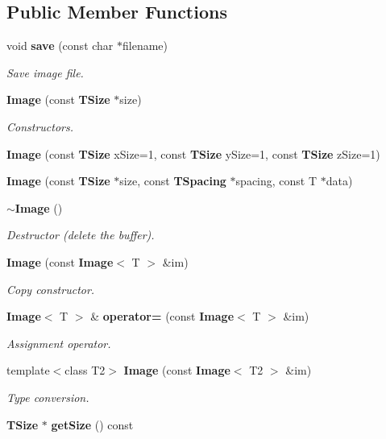\subsection*{Public Member Functions}
\begin{CompactItemize}
\item 
void {\bf save} (const char $\ast$filename)
\begin{CompactList}\small\item\em Save image file. \item\end{CompactList}\item 
{\bf Image} (const {\bf TSize} $\ast$size)
\begin{CompactList}\small\item\em Constructors. \item\end{CompactList}\item 
{\bf Image} (const {\bf TSize} x\-Size=1, const {\bf TSize} y\-Size=1, const {\bf TSize} z\-Size=1)
\item 
{\bf Image} (const {\bf TSize} $\ast$size, const {\bf TSpacing} $\ast$spacing, const T $\ast$data)
\item 
{\bf $\sim$Image} ()
\begin{CompactList}\small\item\em Destructor (delete the buffer). \item\end{CompactList}\item 
{\bf Image} (const {\bf Image}$<$ T $>$ \&im)
\begin{CompactList}\small\item\em Copy constructor. \item\end{CompactList}\item 
{\bf Image}$<$ T $>$ \& {\bf operator=} (const {\bf Image}$<$ T $>$ \&im)
\begin{CompactList}\small\item\em Assignment operator. \item\end{CompactList}\item 
template$<$class T2$>$ {\bf Image} (const {\bf Image}$<$ T2 $>$ \&im)
\begin{CompactList}\small\item\em Type conversion. \item\end{CompactList}\item 
{\bf TSize} $\ast$ {\bf get\-Size} () const 

\end{CompactItemize}

